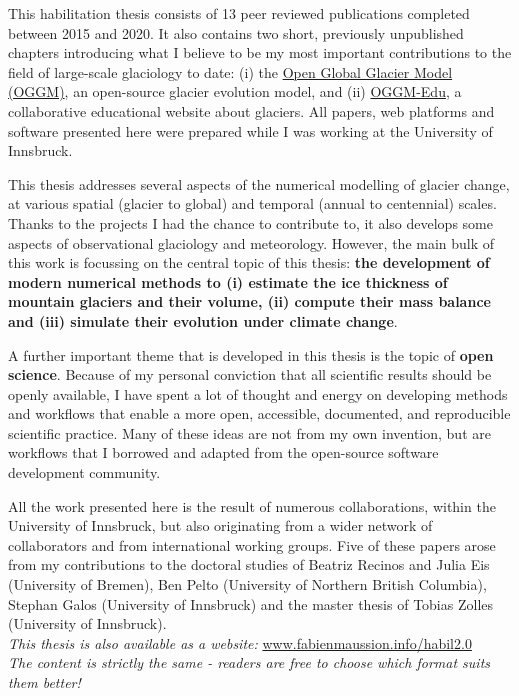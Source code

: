 

This habilitation thesis consists of 13 peer reviewed publications completed
between 2015 and 2020. It also contains two short, previously unpublished chapters
introducing what I believe to be my most important contributions to the field of
large-scale glaciology to date: (i) the \href{https://oggm.org}{Open Global Glacier Model (OGGM)},
an open-source glacier evolution model, and (ii) \href{https://edu.oggm.org}{OGGM-Edu},
a collaborative educational website about glaciers. All papers, web platforms
and software presented here were prepared while I was working at the University of Innsbruck.

This thesis addresses several aspects of the numerical modelling of glacier change,
at various spatial (glacier to global) and temporal (annual to centennial) scales. Thanks to
the projects I had the chance to contribute to, it also develops some aspects of observational
glaciology and meteorology. However, the main bulk of this work is focussing on the central
topic of this thesis: \textbf{the development of modern numerical methods to (i) estimate the ice
thickness of mountain glaciers and their volume, (ii) compute their mass balance and (iii)
simulate their evolution under climate change}.

A further important theme that is developed in this thesis is the topic of \textbf{open science}.
Because of my personal conviction that all scientific results should be openly available, I have
spent a lot of thought and energy on developing methods and workflows that enable a more open,
accessible, documented, and reproducible scientific practice. Many of these ideas are not from my
own invention, but are workflows that I borrowed and adapted from the open-source software
development community.

All the work presented here is the result of numerous collaborations, within the University of Innsbruck,
but also originating from a wider network of collaborators and from international working groups.
Five of these papers arose from my contributions
to the doctoral studies of Beatriz Recinos and Julia Eis (University of Bremen), Ben Pelto (University of
Northern British Columbia), Stephan Galos (University of Innsbruck) and the master thesis of
Tobias Zolles (University of Innsbruck). \\ [0.8cm]

\textit{This thesis is also available as a website:}
\href{https://fabienmaussion.info/habil2.0}{www.fabienmaussion.info/habil2.0} \\
\textit{The content is strictly the same - readers are free to choose which format suits them better!}
